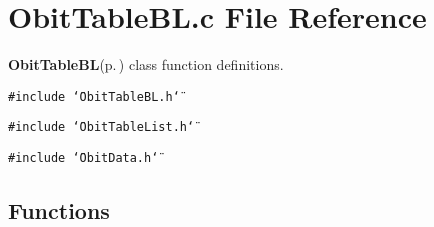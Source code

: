 \section{Obit\-Table\-BL.c File Reference}
\label{ObitTableBL_8c}
{\bf Obit\-Table\-BL}{\rm (p.\,\pageref{structObitTableBL})} class function definitions. 

{\tt \#include \char`\"{}Obit\-Table\-BL.h\char`\"{}}\par
{\tt \#include \char`\"{}Obit\-Table\-List.h\char`\"{}}\par
{\tt \#include \char`\"{}Obit\-Data.h\char`\"{}}\par
\subsection*{Functions}
